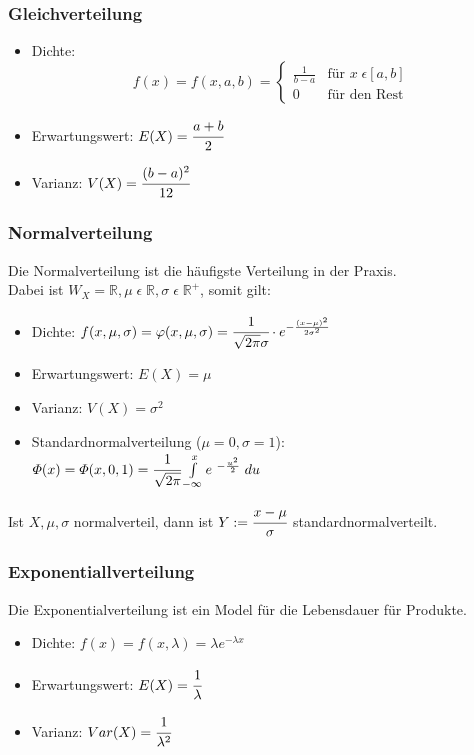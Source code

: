 \documentclass[a4paper]{scrartcl}
\begin{document}
            \subsubsection{Gleichverteilung}
            \begin{itemize}
                \item Dichte: \[f(x) = f(x,a,b)=
                                \begin{cases}
                                    \frac{1}{b - a}     & \text{für } x \; \epsilon [a, b] \\
                                    0     & \text{für den Rest} 
                                \end{cases}
                            \] 
                \item Erwartungswert: \(E(X) = \cfrac{a+b}{2} \)
                \item Varianz: \(V(X) = \cfrac{(b-a)^2}{12} \)
            \end{itemize}
            \subsubsection{Normalverteilung}
                Die Normalverteilung ist die häufigste Verteilung in der Praxis.\\
                Dabei ist  \(W_X = \mathbb{R}, \mu \; \epsilon \; \mathbb{R}, \sigma \; \epsilon \; \mathbb{R}^+ \), somit gilt: 
                \begin{itemize}
                    \item Dichte: \( f(x, \mu, \sigma)  = \varphi(x, \mu, \sigma) = \cfrac{1}{\sqrt{2\pi} \sigma} \cdot e^{- \frac{(x - \mu)^2}{2 \sigma^2}} \) 
                    \item Erwartungswert: \(E(X) = \mu\)
                    \item Varianz: \(V(X) = \sigma^2\)
                    \item Standardnormalverteilung (\(\mu = 0, \sigma = 1\)):  \(\varPhi(x) = \varPhi(x,0,1) = \cfrac{1}{\sqrt{2\pi}} \int\limits_{-\infty}^xe^{\ - \frac{u^2}{2}} \; du\)
                \end{itemize}
                Ist \(X, \mu, \sigma\) normalverteil, dann ist \(Y := \cfrac{x - \mu}{\sigma}\) standardnormalverteilt.
            \subsubsection{Exponentiallverteilung}
                Die Exponentialverteilung ist ein Model für die Lebensdauer für Produkte.
                \begin{itemize}
                    \item Dichte: \(f(x) = f(x, \lambda) = \lambda e^{-\lambda x}\) 
                    \item Erwartungswert: \(E(X) = \cfrac{1}{\lambda} \)
                    \item Varianz: \(Var(X) =  \cfrac{1}{\lambda^2} \)
                \end{itemize}
\end{document}
